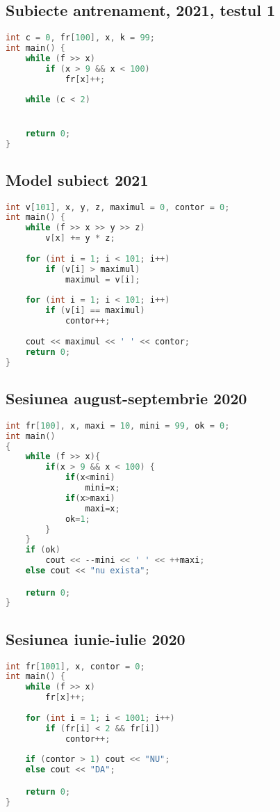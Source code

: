 \documentclass[10pt, a4paper, twocolumn]{article}
\begin{document}
\subsection*{Subiecte antrenament, 2021, testul 1}
\begin{lstlisting}[language=C++]
int c = 0, fr[100], x, k = 99;
int main() {
    while (f >> x)
        if (x > 9 && x < 100)
            fr[x]++;
    
    while (c < 2)


    return 0;
}
\end{lstlisting}
\vspace{0.5cm}

\subsection*{Model subiect 2021}
\begin{lstlisting}[language=C++]
int v[101], x, y, z, maximul = 0, contor = 0;
int main() {
    while (f >> x >> y >> z)
        v[x] += y * z;
    
    for (int i = 1; i < 101; i++)
        if (v[i] > maximul)
            maximul = v[i];
    
    for (int i = 1; i < 101; i++)
        if (v[i] == maximul)
            contor++;
    
    cout << maximul << ' ' << contor;
    return 0;
}
\end{lstlisting}
\vspace{0.5cm}

\subsection*{Sesiunea august-septembrie 2020}
\begin{lstlisting}[language=C++]
int fr[100], x, maxi = 10, mini = 99, ok = 0;
int main()
{
    while (f >> x){
        if(x > 9 && x < 100) {
		    if(x<mini)
			    mini=x;
            if(x>maxi)
			    maxi=x;
            ok=1;
        }
    }
    if (ok)
        cout << --mini << ' ' << ++maxi;
    else cout << "nu exista";

    return 0;
}
\end{lstlisting}
\vspace{0.5cm}

\subsection*{Sesiunea iunie-iulie 2020}
\begin{lstlisting}[language=C++]
int fr[1001], x, contor = 0;
int main() {
    while (f >> x)
        fr[x]++;
    
    for (int i = 1; i < 1001; i++)
        if (fr[i] < 2 && fr[i])
            contor++;
    
    if (contor > 1) cout << "NU";
    else cout << "DA";

    return 0;
}
\end{lstlisting}
\vspace{0.5cm}
\end{document}
